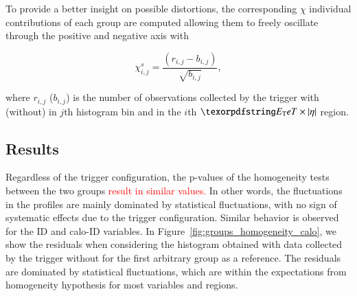 To provide a better insight on possible distortions, the corresponding $\chi$
individual contributions of each group are computed allowing them to freely
oscillate through the positive and negative axis with

\begin{equation}
  \chi_{i,j}^{s} = \frac{(r_{i,j} - b_{i,j})}{\sqrt{b_{i,j}}},
  \label{eq:signed_chi}
\end{equation}

\noindent where $r_{i,j}$ ($b_{i,j}$) is the number of observations collected by
the trigger with (without) \rnn{} in $j$th histogram bin and in the $i$th
$\et{}\times\abseta{}$ region.




\subsection{Results}\label{top:agreement_homogeneity_results}




Regardless of the trigger configuration, the p-values of the homogeneity tests between the two groups \textcolor{red}{result in similar values.} In other words, the fluctuations in the profiles are mainly dominated by statistical fluctuations, with no sign of systematic effects due to the trigger configuration. Similar behavior is observed for the ID and calo-ID variables. In Figure~\ref{fig:groups_homogeneity_calo}, we show the residuals when considering the histogram obtained with data collected by the trigger without \rnn{} for the first arbitrary group as a reference. The residuals are dominated by statistical fluctuations, which are within the expectations from homogeneity hypothesis for most variables and regions.


